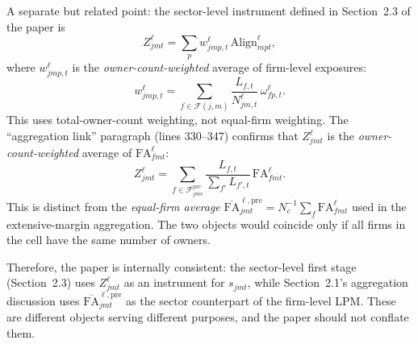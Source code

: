 \documentclass{article}
\newcommand{\Align}{\mathrm{Align}}
\newcommand{\FA}{\mathrm{FA}}
\newcommand{\cF}{\mathcal{F}}
\newcommand{\cFpre}{\mathcal{F}^{\mathrm{pre}}}
\theoremstyle{plain}
\begin{document}
A separate but related point: the sector-level instrument defined in
Section~2.3 of the paper is
\[
  Z^\ell_{jmt} = \sum_p w^\ell_{jmp,t}\,\Align^\ell_{mpt},
\]
where $w^\ell_{jmp,t}$ is the \emph{owner-count-weighted} average of
firm-level exposures:
\[
  w^\ell_{jmp,t}
  = \sum_{f\in\cF(j,m)} \frac{L_{f,t}}{N^\ell_{jm,t}}\,\omega^\ell_{fp,t}.
\]
This uses total-owner-count weighting, not equal-firm weighting.  The
``aggregation link'' paragraph (lines 330--347) confirms that $Z^\ell_{jmt}$
is the \emph{owner-count-weighted} average of $\FA^\ell_{fmt}$:
\[
  Z^\ell_{jmt}
  = \sum_{f\in\cFpre_{jme}} \frac{L_{f,t}}{\sum_{f'} L_{f',t}}\,\FA^\ell_{fmt}.
\]
This is distinct from the \emph{equal-firm average}
$\overline{\FA}^{\ell,\mathrm{pre}}_{jmt} = N_c^{-1}\sum_f \FA^\ell_{fmt}$
used in the extensive-margin aggregation.  The two objects would coincide only
if all firms in the cell have the same number of owners.

Therefore, the paper is internally consistent: the sector-level first stage
(Section~2.3) uses $Z^\ell_{jmt}$ as an instrument for $s_{jmt}$, while
Section~2.1's aggregation discussion uses
$\overline{\FA}^{\ell,\mathrm{pre}}_{jmt}$ as the sector counterpart of the
firm-level LPM.  These are different objects serving different purposes, and
the paper should not conflate them.
\end{document}
